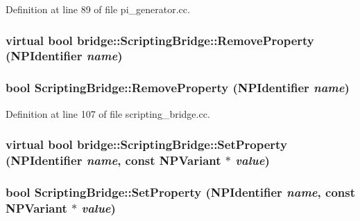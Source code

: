 Definition at line 89 of file pi\_\-generator.cc.

\hypertarget{classbridge_1_1_scripting_bridge_aeda2f5f7f5669003d573cdc2f3dc8fe8}{
\subsubsection[{RemoveProperty}]{\setlength{\rightskip}{0pt plus 5cm}virtual bool bridge::ScriptingBridge::RemoveProperty (NPIdentifier {\em name})}}
\label{classbridge_1_1_scripting_bridge_aeda2f5f7f5669003d573cdc2f3dc8fe8}
\hypertarget{classbridge_1_1_scripting_bridge_a861437163b8291eb7b302ce8f778022d}{
\subsubsection[{RemoveProperty}]{\setlength{\rightskip}{0pt plus 5cm}bool ScriptingBridge::RemoveProperty (NPIdentifier {\em name})}}
\label{classbridge_1_1_scripting_bridge_a861437163b8291eb7b302ce8f778022d}


Definition at line 107 of file scripting\_\-bridge.cc.

\hypertarget{classbridge_1_1_scripting_bridge_a918981b30a60d961232e693e7ac15652}{
\subsubsection[{SetProperty}]{\setlength{\rightskip}{0pt plus 5cm}virtual bool bridge::ScriptingBridge::SetProperty (NPIdentifier {\em name}, \/  const NPVariant $\ast$ {\em value})}}
\label{classbridge_1_1_scripting_bridge_a918981b30a60d961232e693e7ac15652}
\hypertarget{classbridge_1_1_scripting_bridge_ae73ff0ec0f70dfcd0e22534c8281f3e3}{
\subsubsection[{SetProperty}]{\setlength{\rightskip}{0pt plus 5cm}bool ScriptingBridge::SetProperty (NPIdentifier {\em name}, \/  const NPVariant $\ast$ {\em value})}}
\label{classbridge_1_1_scripting_bridge_ae73ff0ec0f70dfcd0e22534c8281f3e3}


